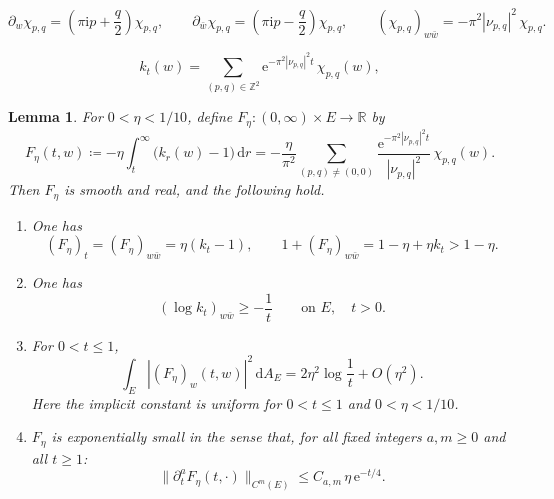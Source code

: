 \documentclass[10pt,a4paper]{amsart}
\newtheorem{lemma}{Lemma}
\begin{document}
	\begin{equation}
		\partial_w\chi_{p,q}
		=\left(\pi\mathrm{i}p+\frac q2\right)\chi_{p,q},
		\qquad
		\partial_{\bar w}\chi_{p,q}
		=\left(\pi\mathrm{i}p-\frac q2\right)\chi_{p,q},
		\qquad
		(\chi_{p,q})_{w\bar w}=-\pi^2|\nu_{p,q}|^2\,\chi_{p,q}.
		\label{eq:character-derivatives}
	\end{equation}

	\begin{equation}
		k_t(w)=\sum_{(p,q)\in\mathbb Z^2}
		\mathrm{e}^{-\pi^2|\nu_{p,q}|^2t}\,\chi_{p,q}(w),
		\label{eq:heat-Fourier}
	\end{equation}

	\begin{lemma}
		\label{lem:heat-fiber}
		For $0<\eta<1/10$, define
		$F_\eta\colon(0,\infty)\times E\to\mathbb R$ by
		\begin{equation}
			F_\eta(t,w)\coloneqq -\eta\int_t^\infty\bigl(k_r(w)-1\bigr)\,\mathrm{d}r
			=-\frac{\eta}{\pi^2}
			\sum_{(p,q)\ne(0,0)}
			\frac{\mathrm{e}^{-\pi^2|\nu_{p,q}|^2t}}
			{|\nu_{p,q}|^2}\,\chi_{p,q}(w).
			\label{eq:heat-potential}
		\end{equation}
		Then $F_\eta$ is smooth and real, and the following hold.
		\begin{enumerate}[label={(\arabic*)}]
			\item One has
			\begin{equation}
				(F_\eta)_t=(F_\eta)_{w\bar w}=\eta(k_t-1),
				\qquad
				1+(F_\eta)_{w\bar w}=1-\eta+\eta k_t>1-\eta.
				\label{eq:heat-identity}
			\end{equation}
			\item One has
			\begin{equation}
				(\log k_t)_{w\bar w}\ge-\frac1t
				\qquad\text{on }E,\quad t>0.
				\label{eq:log-heat}
			\end{equation}
			\item For $0<t\le1$,
			\begin{equation}
				\int_E|(F_\eta)_w(t,w)|^2\,\mathrm{d}A_E
				=2\eta^2\log\frac1t+O(\eta^2).
				\label{eq:heat-energy}
			\end{equation}
			Here the implicit constant is uniform for $0<t\le1$ and
			$0<\eta<1/10$.
			\item $F_\eta$ is exponentially small in the sense that, for all fixed integers $a,m\ge0$ and
			all $t\ge1$:
			\begin{equation}
				\|\partial_t^a F_\eta(t,\cdot)\|_{C^m(E)}
				\le C_{a,m}\,\eta\,\mathrm{e}^{-t/4}.
				\label{eq:heat-flat-F}
			\end{equation}
		\end{enumerate}
	\end{lemma}
\end{document}
